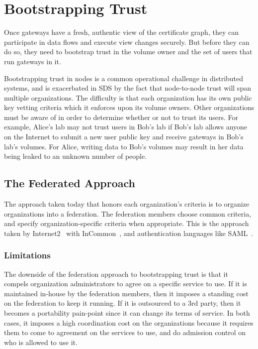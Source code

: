 \section{Bootstrapping Trust}
\label{sec:bootstrapping-trust}

Once gateways have a fresh, authentic view of the certificate graph, they can
participate in data flows and execute view changes securely.  But before they
can do so, they need to bootstrap trust in the volume owner and the set of users
that run gateways in it.

Bootstrapping trust in nodes is a common operational challenge in
distributed systems, and is exacerbated in SDS by the fact that node-to-node
trust will span multiple organizations.
The difficulty is that each organization has its own public
key vetting criteria which it enforces upon its volume owners.
Other organizations must be aware of in order to determine
whether or not to trust its users.  For example, Alice's lab may
not trust users in Bob's lab if Bob's lab allows anyone on the Internet
to submit a new user public key and receive gateways in Bob's
lab's volumes.  For Alice, writing data to Bob's volumes may result in her data
being leaked to an unknown number of people.

\subsection{The Federated Approach}

The approach taken today that honors each organization's criteria is to organize
organizations into a federation.  The federation members choose common criteria,
and specify organization-specific criteria when appropriate.  This is the
approach taken by Internet2~\cite{internet2} with InCommon~\cite{incommon}, and
authentication languages like SAML~\cite{saml}.

\subsubsection{Limitations}

The downside of the federation approach to bootstrapping trust is that it compels organization
administrators to agree on a specific service to use.  If it is maintained in-house by the
federation members, then it imposes a standing cost on the federation to keep it
running.  If it is outsourced to a 3rd party, then it becomes a portability
pain-point since it can change its terms of service.  In both cases, it imposes
a high coordination cost on the organizations because it requires them to come
to agreement on the services to use, and do admission control on who is allowed
to use it.

